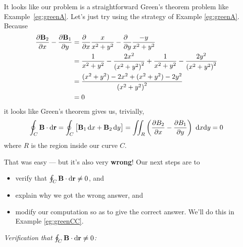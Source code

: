 \begin{eg}
\begin{nfig}
\end{nfig}
It looks like our problem is a straightforward Green's theorem problem
like Example~\ref{eg:greenA}. Let's just try using the strategy of 
Example \ref{eg:greenA}. Because
\begin{align*}
\frac{\partial \vB_2}{\partial x} - \frac{\partial \vB_1}{\partial y}
&=\frac{\partial\hfill}{\partial x}\frac{x}{x^2+y^2} 
                - \frac{\partial\hfill}{\partial y}\frac{-y}{x^2+y^2} \\
&= \frac{1}{x^2+y^2} - \frac{2x^2}{{(x^2+y^2)}^2}
  +\frac{1}{x^2+y^2} - \frac{2y^2}{{(x^2+y^2)}^2}  \\
&= \frac{(x^2+y^2) - 2x^2 + (x^2+y^2) - 2y^2}{{(x^2+y^2)}^2}  \\
&=0
\end{align*}
it looks like Green's theorem gives us, trivially,
\begin{equation*}
\oint_C\mathbf{B}\cdot\mathrm{d}\mathbf{r}
=\oint_C\big[\mathbf{B}_1\,\mathrm{d}x +\mathbf{B}_2\,\mathrm{d}y\big]
= \iint_{R}\left(\frac{\partial B_2}{\partial x} 
                - \frac{\partial B_1}{\partial y}\right)\ \mathrm{d}x\mathrm{d}y
=0
\end{equation*}
where $R$ is the region inside our curve $C$. 

That was easy --- but it's also very \textbf{wrong}!
Our next steps are to 
\begin{itemize}\itemsep1pt \parskip0pt  %
\item
verify that $\oint_C\mathbf{B}\cdot\mathrm{d}\mathbf{r}\ne 0$, and 
\item
explain why we got the wrong answer, and
\item
modify our computation so as to give the correct answer.
We'll do this in Example \ref{eg:greenCC}.
\end{itemize}

\noindent
\emph{Verification that $\oint_C\mathbf{B}\cdot\mathrm{d}\mathbf{r}\ne 0$:}\ \ \ 


\end{eg}
